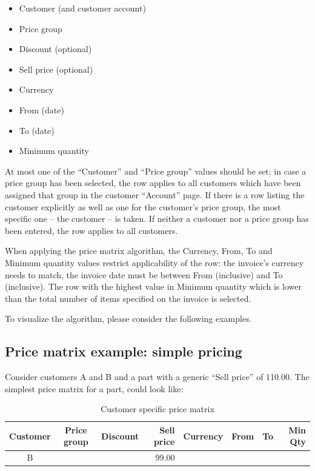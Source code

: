 \begin{itemize}
	\item Customer (and customer account)
	\item Price group
	\item Discount (optional)
	\item Sell price (optional)
	\item Currency
	\item From (date)
	\item To (date)
	\item Minimum quantity
\end{itemize}

At most one of the ``Customer'' and ``Price group'' values should be set; in case a price group has been selected,
the row applies to all customers which have been assigned that group in the customer ``Account'' page. If there
is a row listing the customer explicitly as well as one for the customer's price group, the most specific one --
the customer -- is taken. If neither a customer nor a price group has been entered, the row applies to all customers.

When applying the price matrix algorithm, the Currency, From, To and Minimum quantity values restrict applicability
of the row: the invoice's currency needs to match, the invoice date must be between From (inclusive) and To (inclusive).
The row with the highest value in Minimum quantity which is lower than the total number of items specified on the invoice
is selected.

To visualize the algorithm, please consider the following examples.

\subsection{Price matrix example: simple pricing}

Consider customers A and B and a part with a generic ``Sell price'' of 110.00.
The simplest price matrix for a part, could look like:

\begin{table}[H]
		\caption{Customer specific price matrix}
\begin{tabular}{|ccrrcrrr|}
	\hline
	\bf Customer & \bf Price group & \bf Discount &  \bf Sell price & \bf Currency & \bf From & \bf To & \bf Min Qty \\
	\hline
	B & & & 99.00 & & & & \\
	\hline
\end{tabular}
\end{table}

